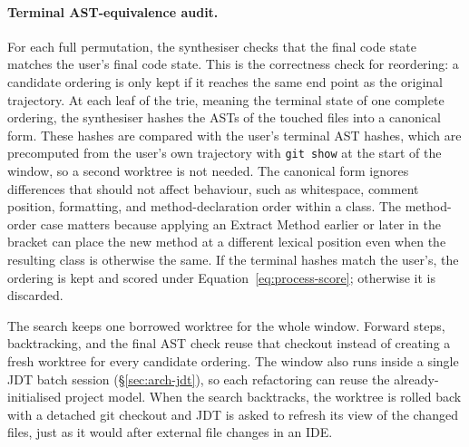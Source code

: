 \paragraph{Terminal AST-equivalence audit.}
\label{sec:methodology-canonical-audit}
For each full permutation, the synthesiser checks that the final code state matches the user's final code state. This is the correctness check for reordering: a candidate ordering is only kept if it reaches the same end point as the original trajectory. At each leaf of the trie, meaning the terminal state of one complete ordering, the synthesiser hashes the ASTs of the touched files into a canonical form. These hashes are compared with the user's terminal AST hashes, which are precomputed from the user's own trajectory with \texttt{git show} at the start of the window, so a second worktree is not needed. The canonical form ignores differences that should not affect behaviour, such as whitespace, comment position, formatting, and method-declaration order within a class. The method-order case matters because applying an Extract Method earlier or later in the bracket can place the new method at a different lexical position even when the resulting class is otherwise the same. If the terminal hashes match the user's, the ordering is kept and scored under Equation~\eqref{eq:process-score}; otherwise it is discarded.

The search keeps one borrowed worktree for the whole window. Forward steps, backtracking, and the final AST check reuse that checkout instead of creating a fresh worktree for every candidate ordering. The window also runs inside a single JDT batch session (\S\ref{sec:arch-jdt}), so each refactoring can reuse the already-initialised project model. When the search backtracks, the worktree is rolled back with a detached git checkout and JDT is asked to refresh its view of the changed files, just as it would after external file changes in an IDE.


